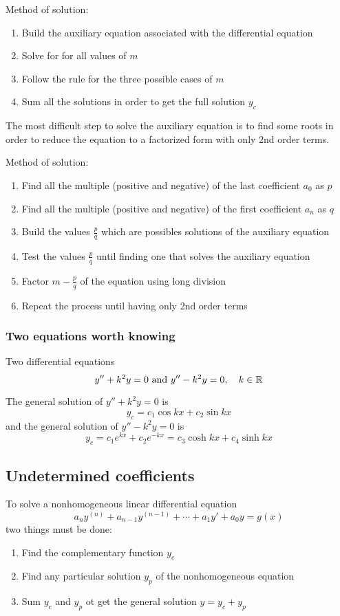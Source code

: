 \documentclass[10pt, twocolumn]{article}
\theoremstyle{definition}
\begin{document}
Method of solution:
\begin{enumerate}
  \item Build the auxiliary equation associated with the differential equation
  \item Solve for for all values of \(m\)
  \item Follow the rule for the three possible cases of \(m\)
  \item Sum all the solutions in order to get the full solution \(y_c \)
\end{enumerate}

The most difficult step to solve the auxiliary equation is to find some roots in order to reduce the equation to a factorized form with only 2nd order terms.

Method of solution:
\begin{enumerate}
  \item Find all the multiple (positive and negative) of the last coefficient \(a_0 \) as \(p\)
  \item Find all the multiple (positive and negative) of the first coefficient \(a_n \) as \(q\)
  \item Build the values \(\frac{p}{q}\) which are possibles solutions of the auxiliary equation
  \item Test the values \(\frac{p}{q}\) until finding one that solves the auxiliary equation
  \item Factor \(m - \frac{p}{q}\) of the equation using long division
  \item Repeat the process until having only 2nd order terms
\end{enumerate}


\subsubsection*{Two equations worth knowing}
Two differential equations
\[
  y'' + k^2 y = 0 \text{ and } y'' - k^2 y = 0, \quad k \in \mathbb{R}
\]

The general solution of \(y'' + k^2 y = 0\) is
\[
  y_c = c_1 \cos{kx} + c_2 \sin{kx}
\]
and the general solution of  \(y'' - k^2 y = 0\) is
\[
  y_c = c_1 e^{kx} + c_2 e^{-kx} = c_3 \cosh{kx} + c_4 \sinh{kx}
\]


\subsection{Undetermined coefficients}
To solve a nonhomogeneous linear differential equation
\[
  a_n y^{(n)} + a_{n - 1} y^{(n - 1)} + \cdots + a_1 y' + a_0 y = g(x)
\]
two things must be done:
\begin{enumerate}
  \item Find the complementary function \(y_c \)
  \item Find any particular solution \(y_p \) of the nonhomogeneous equation
  \item Sum \(y_c \) and \(y_p \) ot get the general solution \(y = y_c + y_p \)
\end{enumerate}
\end{document}
